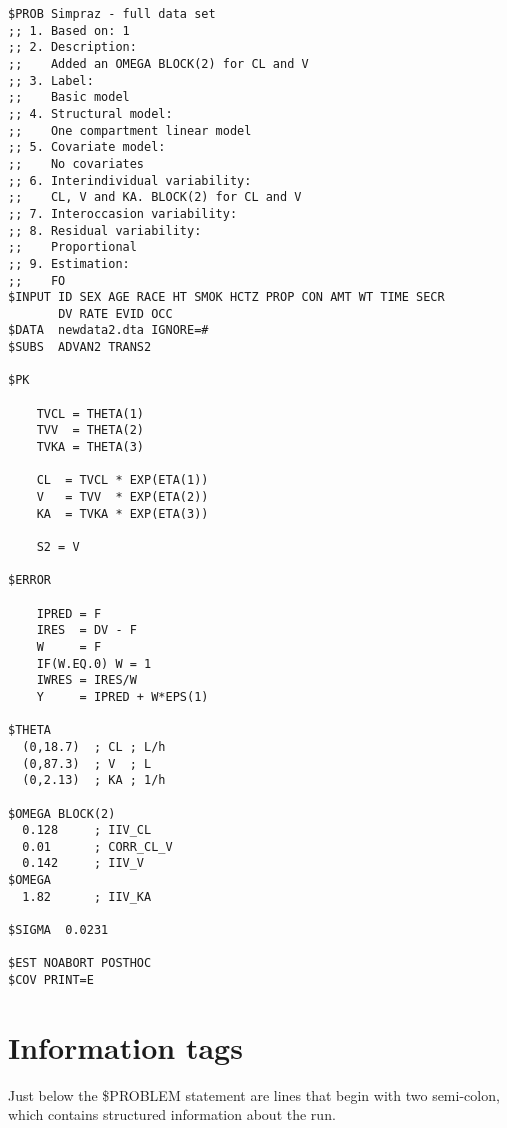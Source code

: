 \begin{verbatim}
$PROB Simpraz - full data set
;; 1. Based on: 1
;; 2. Description:
;;    Added an OMEGA BLOCK(2) for CL and V
;; 3. Label:
;;    Basic model
;; 4. Structural model:
;;    One compartment linear model
;; 5. Covariate model:
;;    No covariates
;; 6. Interindividual variability:
;;    CL, V and KA. BLOCK(2) for CL and V
;; 7. Interoccasion variability:
;; 8. Residual variability:
;;    Proportional
;; 9. Estimation:
;;    FO
$INPUT ID SEX AGE RACE HT SMOK HCTZ PROP CON AMT WT TIME SECR
       DV RATE EVID OCC
$DATA  newdata2.dta IGNORE=#
$SUBS  ADVAN2 TRANS2

$PK 

    TVCL = THETA(1)
    TVV  = THETA(2)
    TVKA = THETA(3)

    CL  = TVCL * EXP(ETA(1))
    V   = TVV  * EXP(ETA(2))
    KA  = TVKA * EXP(ETA(3))

    S2 = V

$ERROR 

    IPRED = F
    IRES  = DV - F
    W     = F
    IF(W.EQ.0) W = 1
    IWRES = IRES/W
    Y     = IPRED + W*EPS(1)

$THETA 
  (0,18.7)  ; CL ; L/h
  (0,87.3)  ; V  ; L
  (0,2.13)  ; KA ; 1/h

$OMEGA BLOCK(2)
  0.128     ; IIV_CL
  0.01      ; CORR_CL_V
  0.142     ; IIV_V
$OMEGA
  1.82      ; IIV_KA

$SIGMA  0.0231 

$EST NOABORT POSTHOC
$COV PRINT=E
\end{verbatim}
\newpage
\section{Information tags}
Just below the \$PROBLEM statement are lines that begin with two semi-colon, which contains structured information about the run. 

